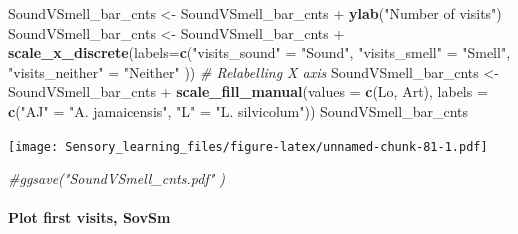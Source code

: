 \documentclass[]{article}
\newenvironment{Shaded}{\begin{snugshade}}{\end{snugshade}}
\newcommand{\KeywordTok}[1]{\textcolor[rgb]{0.13,0.29,0.53}{\textbf{{#1}}}}
\newcommand{\DataTypeTok}[1]{\textcolor[rgb]{0.13,0.29,0.53}{{#1}}}
\newcommand{\StringTok}[1]{\textcolor[rgb]{0.31,0.60,0.02}{{#1}}}
\newcommand{\CommentTok}[1]{\textcolor[rgb]{0.56,0.35,0.01}{\textit{{#1}}}}
\newcommand{\NormalTok}[1]{{#1}}
\let\oldparagraph\paragraph
\renewcommand{\paragraph}[1]{\oldparagraph{#1}\mbox{}}
\begin{document}
\begin{Shaded}
\begin{Highlighting}[]
\NormalTok{SoundVSmell_bar_cnts <-}\StringTok{ }\NormalTok{SoundVSmell_bar_cnts +}\StringTok{ }\KeywordTok{ylab}\NormalTok{(}\StringTok{"Number of visits"}\NormalTok{)}
\NormalTok{SoundVSmell_bar_cnts <-}\StringTok{ }\NormalTok{SoundVSmell_bar_cnts +}\StringTok{ }\KeywordTok{scale_x_discrete}\NormalTok{(}\DataTypeTok{labels=}\KeywordTok{c}\NormalTok{(}\StringTok{"visits_sound"} \NormalTok{=}\StringTok{ "Sound"}\NormalTok{, }\StringTok{"visits_smell"} \NormalTok{=}\StringTok{ "Smell"}\NormalTok{,}
                              \StringTok{"visits_neither"} \NormalTok{=}\StringTok{ "Neither"} \NormalTok{))  }\CommentTok{# Relabelling X axis}
\NormalTok{SoundVSmell_bar_cnts <-}\StringTok{ }\NormalTok{SoundVSmell_bar_cnts +}\StringTok{ }\KeywordTok{scale_fill_manual}\NormalTok{(}\DataTypeTok{values =} \KeywordTok{c}\NormalTok{(Lo, Art), }\DataTypeTok{labels =} \KeywordTok{c}\NormalTok{(}\StringTok{"AJ"} \NormalTok{=}\StringTok{ "A. jamaicensis"}\NormalTok{, }\StringTok{"L"} \NormalTok{=}\StringTok{ "L. silvicolum"}\NormalTok{))}
\NormalTok{SoundVSmell_bar_cnts}
\end{Highlighting}
\end{Shaded}

\texttt{[image: Sensory\_learning\_files/figure-latex/unnamed-chunk-81-1.pdf]}

\begin{Shaded}
\begin{Highlighting}[]
\CommentTok{#ggsave("SoundVSmell_cnts.pdf"  )}
\end{Highlighting}
\end{Shaded}

\paragraph{Plot first visits, SovSm}\label{plot-first-visits-sovsm}
\end{document}
